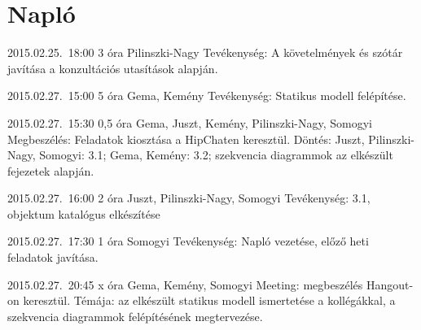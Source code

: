 %
\section{Napló}

\begin{naplo}

\bejegyzes
{2015.02.25.~18:00} %
{3 óra} %
{Pilinszki-Nagy} %
{Tevékenység: A követelmények és szótár javítása a konzultációs utasítások alapján.} %

\bejegyzes
{2015.02.27.~15:00} %
{5 óra} %
{Gema, Kemény} %
{Tevékenység: Statikus modell felépítése.} %

\bejegyzes
{2015.02.27.~15:30} %
{0,5 óra} %
{Gema, Juszt, Kemény, Pilinszki-Nagy, Somogyi} %
{Megbeszélés: Feladatok kiosztása a HipChaten keresztül. Döntés: Juszt, Pilinszki-Nagy, Somogyi: 3.1; Gema, Kemény: 3.2; szekvencia diagrammok az elkészült fejezetek alapján.} %

\bejegyzes
{2015.02.27.~16:00} %
{2 óra} %
{Juszt, Pilinszki-Nagy, Somogyi} %
{Tevékenység: 3.1, objektum katalógus elkészítése} %

\bejegyzes
{2015.02.27.~17:30} %
{1 óra} %
{Somogyi} %
{Tevékenység: Napló vezetése, előző heti feladatok javítása.} %

\bejegyzes
{2015.02.27.~20:45} %
{x óra} %
{Gema, Kemény, Somogyi} %
{Meeting: megbeszélés Hangout-on keresztül. Témája: az elkészült statikus modell ismertetése a kollégákkal, a szekvencia diagrammok felépítésének megtervezése.} %

\end{naplo}

